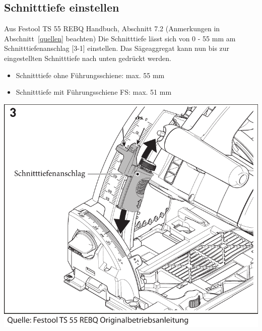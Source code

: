 \documentclass{\basedir/fablab-document}
\begin{document}
\subsection{Schnitttiefe einstellen}
\begin{minipage}{70mm}
   \begin{leftbar}{Aus Festool TS 55 REBQ Handbuch, Abschnitt 7.2 (Anmerkungen in Abschnitt~\ref{quellen} beachten)}
Die Schnitttiefe lässt sich von 0 - 55 mm am
Schnitttiefenanschlag [3-1] einstellen.
Das Sägeaggregat kann nun bis zur eingestellten Schnitttiefe nach unten gedrückt werden.
	\begin{itemize}
	\item Schnitttiefe ohne Führungsschiene: max. 55 mm
	\item Schnitttiefe mit Führungsschiene FS: max. 51 mm
	\end{itemize}
	\end{leftbar}
\end{minipage}
\hspace{7mm}
\begin{minipage}{90mm}
    \centering
	\includegraphics[width=1\textwidth]{img/festool-schnitttiefenanschlag.pdf}
	\label{fig:schnitttiefenanschlag}
\end{minipage}
\end{document}
